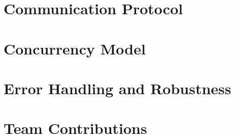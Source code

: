 \documentclass{article}
\begin{document}
\section{Communication Protocol}



\section{Concurrency Model}


\section{Error Handling and Robustness}


\section{Team Contributions}

\end{document}

